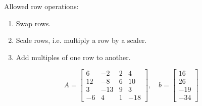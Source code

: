 Allowed row operations:
\begin{enumerate}
    \item {
        Swap rows.
    }
    \item {
        Scale rows, i.e. multiply a row by a scaler.
    }
    \item {
        Add multiples of one row to another.
    }
\end{enumerate}

\begin{example}
    \[
        A = \begin{bmatrix}
            6 & -2 & 2 & 4\\
            12 & -8 & 6 & 10\\
            3 & -13 & 9 & 3\\
            -6 & 4 & 1 & -18
        \end{bmatrix},\quad
        b = \begin{bmatrix}
            16 \\ 26 \\ -19 \\ -34
        \end{bmatrix}
    \]


\end{example}
